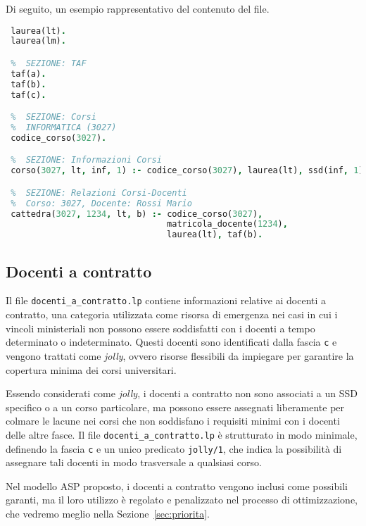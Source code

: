 Di seguito, un esempio rappresentativo del contenuto del file.

\begin{lstlisting}[language=prolog, caption={Esempio struttura dati di \texttt{coperture.lp}.}]    
 %  SEZIONE: Tipi di Corso
 laurea(lt).
 laurea(lm).

 %  SEZIONE: TAF
 taf(a).
 taf(b).
 taf(c).

 %  SEZIONE: Corsi
 %  INFORMATICA (3027)
 codice_corso(3027).

 %  SEZIONE: Informazioni Corsi
 corso(3027, lt, inf, 1) :- codice_corso(3027), laurea(lt), ssd(inf, 1).

 %  SEZIONE: Relazioni Corsi-Docenti
 %  Corso: 3027, Docente: Rossi Mario
 cattedra(3027, 1234, lt, b) :- codice_corso(3027), 
                                matricola_docente(1234), 
                                laurea(lt), taf(b).

\end{lstlisting}


\subsection{Docenti a contratto}\label{sec:rules-docenti-contratto}

Il file \texttt{docenti\_a\_contratto.lp} contiene informazioni relative ai docenti a 
contratto, una categoria utilizzata come risorsa di emergenza nei casi in cui i vincoli 
ministeriali non possono essere soddisfatti con i docenti a tempo determinato o 
indeterminato. Questi docenti sono identificati dalla fascia \texttt{c} e vengono 
trattati come \textit{jolly}, ovvero risorse flessibili da impiegare per garantire la 
copertura minima dei corsi universitari.

Essendo considerati come \textit{jolly}, i docenti a contratto non sono associati a 
un SSD specifico o a un corso particolare, ma possono essere assegnati liberamente per 
colmare le lacune nei corsi che non soddisfano i requisiti minimi con i docenti delle 
altre fasce. Il file \texttt{docenti\_a\_contratto.lp} è strutturato in modo minimale, 
definendo la fascia \texttt{c} e un unico predicato \texttt{jolly/1}, che indica la 
possibilità di assegnare tali docenti in modo trasversale a qualsiasi corso.

Nel modello ASP proposto, i docenti a contratto vengono inclusi come possibili garanti, 
ma il loro utilizzo è regolato e penalizzato nel processo di ottimizzazione, che vedremo
meglio nella Sezione~\ref{sec:priorita}. 


